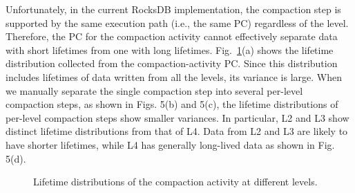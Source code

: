 Unfortunately, in the current RocksDB implementation, the compaction step is supported 
by the same execution path (i.e., the same PC) regardless of the level.
Therefore, the PC for the compaction activity cannot effectively separate data with 
short lifetimes from one with long lifetimes.
Fig.~\ref{fig:compaction}(a) shows 
the lifetime distribution collected from the compaction-activity PC.  
Since this distribution includes lifetimes of data written from all the levels, 
its variance is large.  
When we manually separate the single compaction step into several per-level compaction steps, 
as shown in Figs. 5(b) and 5(c), the lifetime distributions of per-level compaction steps 
show smaller variances.   
In particular, L2 and L3 show distinct lifetime distributions from that of L4.
Data from L2 and L3 are likely to have shorter lifetimes, while L4 has generally
long-lived data as shown in Fig. 5(d).

\begin{figure}[!t]
\centering
\hfill
{}
	\hspace{2pt}
\hfill
\vspace{-1pt}
	\hspace{2pt}
\caption{Lifetime distributions of the compaction activity at different levels.} %
\label{fig:compaction}
\end{figure}

